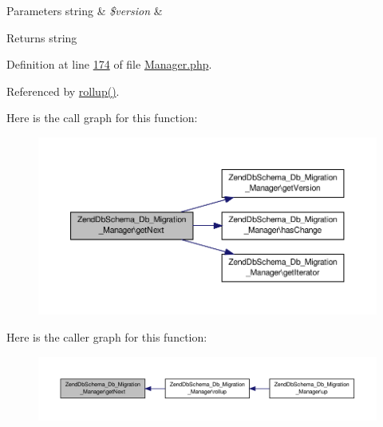 \begin{DoxyParams}[1]{Parameters}
string & {\em \$version} & \\
\hline
\end{DoxyParams}
\begin{DoxyReturn}{Returns}
string 
\end{DoxyReturn}


Definition at line \hyperlink{Manager_8php_source_l00174}{174} of file \hyperlink{Manager_8php_source}{Manager.\-php}.



Referenced by \hyperlink{Manager_8php_source_l00217}{rollup()}.



Here is the call graph for this function\-:\nopagebreak
\begin{figure}[H]
\begin{center}
\leavevmode
\includegraphics[width=350pt]{classZendDbSchema__Db__Migration__Manager_acb171835d37a1596a4ac6db273bf07ae_cgraph}
\end{center}
\end{figure}




Here is the caller graph for this function\-:\nopagebreak
\begin{figure}[H]
\begin{center}
\leavevmode
\includegraphics[width=350pt]{classZendDbSchema__Db__Migration__Manager_acb171835d37a1596a4ac6db273bf07ae_icgraph}
\end{center}
\end{figure}


